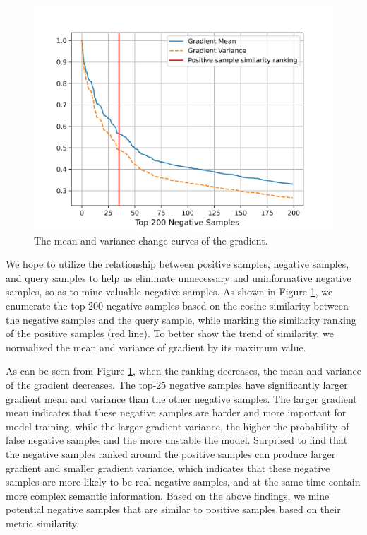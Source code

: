 \documentclass[review]{elsarticle}
\begin{document}
\begin{figure}[!t]
\centering
\includegraphics[scale=0.35]{figure2.jpg}
\caption{The mean and variance change curves of the gradient.}
\label{fig2}
\end{figure}

We hope to utilize the relationship between positive samples, negative samples, and query samples to help us eliminate unnecessary and uninformative negative samples, so as to mine valuable negative samples.  As shown in Figure \ref{fig2}, we enumerate the top-200 negative samples based on the cosine similarity between the negative samples and the query sample, while marking the similarity ranking of the positive samples (red line). To better show the trend of similarity, we normalized the mean and variance of gradient by its maximum value. 

As can be seen from Figure \ref{fig2}, when the ranking decreases, the mean and variance of the gradient decreases. The top-25 negative samples have significantly larger gradient mean and variance than the other negative samples. The larger gradient mean indicates that these negative samples are harder and more important for model training, while the larger gradient variance, the higher the probability of false negative samples and the more unstable the model. Surprised to find that the negative samples ranked around the positive samples can produce larger gradient and smaller gradient variance, which indicates that these negative samples are more likely to be real negative samples, and at the same time contain more complex semantic information. Based on the above findings, we mine potential negative samples that are similar to positive samples based on their metric similarity.
\end{document}
